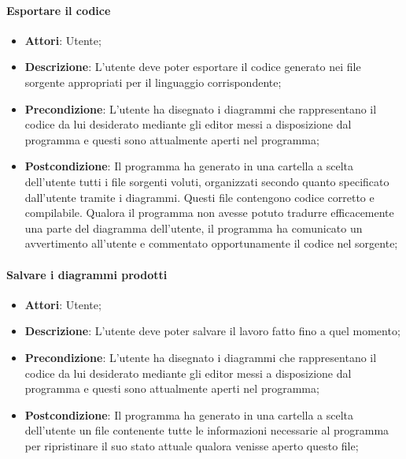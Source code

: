 
\paragraph{Esportare il codice}
\begin{itemize}
	\item \textbf{Attori}: Utente;
	\item \textbf{Descrizione}: L'utente deve poter esportare il codice generato nei file sorgente appropriati per il linguaggio corrispondente;
	\item \textbf{Precondizione}: L'utente ha disegnato i diagrammi che rappresentano il codice da lui desiderato mediante gli editor messi a disposizione dal programma e questi sono attualmente aperti nel programma;
	\item \textbf{Postcondizione}: Il programma ha generato in una cartella a scelta dell'utente tutti i file sorgenti voluti, organizzati secondo quanto specificato dall'utente tramite i diagrammi. Questi file contengono codice corretto e compilabile. Qualora il programma non avesse potuto tradurre efficacemente una parte del diagramma dell'utente, il programma ha comunicato un avvertimento all'utente e commentato opportunamente il codice nel sorgente;
\end{itemize}


\paragraph{Salvare i diagrammi prodotti}
\begin{itemize}
	\item \textbf{Attori}: Utente;
	\item \textbf{Descrizione}: L'utente deve poter salvare il lavoro fatto fino a quel momento;
	\item \textbf{Precondizione}: L'utente ha disegnato i diagrammi che rappresentano il codice da lui desiderato mediante gli editor messi a disposizione dal programma e questi sono attualmente aperti nel programma;
	\item \textbf{Postcondizione}: Il programma ha generato in una cartella a scelta dell'utente un file contenente tutte le informazioni necessarie al programma per ripristinare il suo stato attuale qualora venisse aperto questo file;
\end{itemize}























